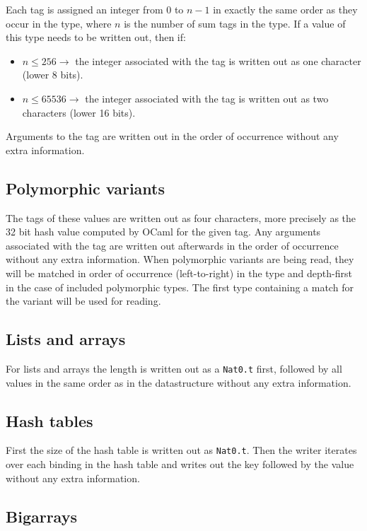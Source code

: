 \documentclass[12pt]{article}
\begin{document}
Each tag is assigned an integer from $0$ to $n - 1$ in exactly the same
order as they occur in the type, where $n$ is the number of sum tags in
the type.  If a value of this type needs to be written out, then if:

\begin{itemize}
\item $n \leq 256 \rightarrow$ the integer associated with the tag is written out as one character (lower 8 bits).
\item $n \leq 65536 \rightarrow$ the integer associated with the tag is written out as two characters (lower 16 bits).
\end{itemize}

Arguments to the tag are written out in the order of occurrence without
any extra information.

\subsection{Polymorphic variants}

The tags of these values are written out as four characters, more
precisely as the 32 bit hash value computed by OCaml for the given tag.
Any arguments associated with the tag are written out afterwards in the
order of occurrence without any extra information.  When polymorphic
variants are being read, they will be matched in order of occurrence
(left-to-right) in the type and depth-first in the case of included
polymorphic types.  The first type containing a match for the variant
will be used for reading.

\subsection{Lists and arrays}

For lists and arrays the length is written out as a \verb=Nat0.t=
first, followed by all values in the same order as in the datastructure
without any extra information.

\subsection{Hash tables}

First the size of the hash table is written out as \verb=Nat0.t=.
Then the writer iterates over each binding in the hash table and writes
out the key followed by the value without any extra information.

\subsection{Bigarrays}
\end{document}
